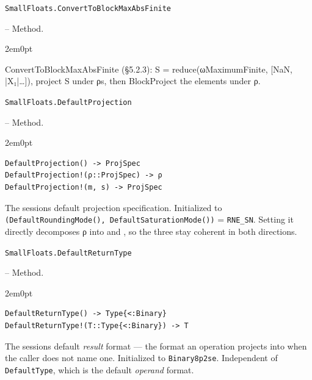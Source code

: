 \par\medskip\noindent\begin{minipage}{\linewidth}
\hypertarget{9309677842871381966}{\texttt{SmallFloats.ConvertToBlockMaxAbsFinite}}  -- {Method.}
\nopagebreak
\begin{adjustwidth}{2em}{0pt}

ConvertToBlockMaxAbsFinite (§5.2.3): S = reduce(ωMaximumFinite, [NaN, |X₁|…]), project S under ρs, then BlockProject the elements under ρ.



\end{adjustwidth}
\end{minipage}
\par\medskip

\par\medskip\noindent\begin{minipage}{\linewidth}
\hypertarget{17118068279635247347}{\texttt{SmallFloats.DefaultProjection}}  -- {Method.}
\nopagebreak
\begin{adjustwidth}{2em}{0pt}


\begin{verbatim}
DefaultProjection() -> ProjSpec
DefaultProjection!(ρ::ProjSpec) -> ρ
DefaultProjection!(m, s) -> ProjSpec
\end{verbatim}

The session{\textquotesingle}s default projection specification. Initialized to \texttt{(\allowbreak{}DefaultRoundingMode(\allowbreak{}), DefaultSaturationMode(\allowbreak{}))} = \texttt{RNE\_\allowbreak{}SN}. Setting it directly decomposes ρ into  and , so the three stay coherent in both directions.



\end{adjustwidth}
\end{minipage}
\par\medskip

\par\medskip\noindent\begin{minipage}{\linewidth}
\hypertarget{2178409582565511335}{\texttt{SmallFloats.DefaultReturnType}}  -- {Method.}
\nopagebreak
\begin{adjustwidth}{2em}{0pt}


\begin{verbatim}
DefaultReturnType() -> Type{<:Binary}
DefaultReturnType!(T::Type{<:Binary}) -> T
\end{verbatim}

The session{\textquotesingle}s default \emph{result} format — the format an operation projects into when the caller does not name one. Initialized to \texttt{Binary8p2se}. Independent of \texttt{DefaultType}, which is the default \emph{operand} format.



\end{adjustwidth}
\end{minipage}
\par\medskip

